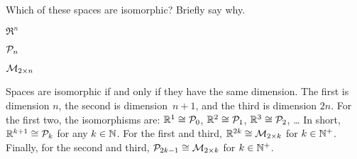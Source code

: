 \documentclass[11pt,answers]{examjh}
\begin{document}
\begin{questions}
\question
Which of these spaces are isomorphic?  Briefly say why.
\begin{parts}
\item $\Re^n$
\item $\mathcal{P}_n$
\item $\mathcal{M}_{2\times n}$
\begin{solution}[0.5in]
Spaces are isomorphic if and only if they have the same dimension.
The first is dimension $n$, the second is dimension~$n+1$, and the third
is dimension $2n$.
For the first two, the isomorphisms are:
$\mathbb{R}^1\cong \mathcal{P}_0$, 
$\mathbb{R}^2\cong \mathcal{P}_1$, 
$\mathbb{R}^3\cong \mathcal{P}_2$, \ldots\@
In short, $\mathbb{R}^{k+1}\cong\mathcal{P}_{k}$ for any $k\in\mathbb{N}$.
For the first and third, $\mathbb{R}^{2k}\cong\mathcal{M}_{2\times k}$ for $k\in\mathbb{N}^+$.
Finally, for the second and third,
$\mathcal{P}_{2k-1}\cong\mathcal{M}_{2\times k}$ for $k\in\mathbb{N}^+$.
\end{solution}
\end{parts}



\end{questions}
\end{document}
